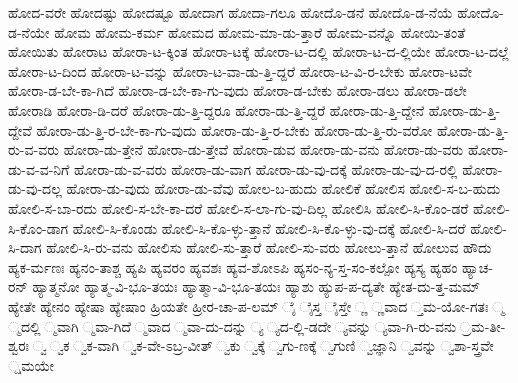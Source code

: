 {ಹೋದ-ವರೇ
ಹೋದಷ್ಟು
ಹೋದಷ್ಟೂ
ಹೋದಾಗ
ಹೋದಾ-ಗಲೂ
ಹೋದೊ-ಡನೆ
ಹೋದೊ-ಡ-ನೆಯೆ
ಹೋದೊ-ಡ-ನೆಯೇ
ಹೋಮ
ಹೋಮ-ಕರ್ಮ
ಹೋಮದ
ಹೋಮ-ಮಾ-ಡು-ತ್ತಾರೆ
ಹೋಮ-ವನ್ನೊ
ಹೋಯಿ-ತಂತೆ
ಹೋಯಿತು
ಹೋರಾಟ
ಹೋರಾ-ಟ-ಕ್ಕಿಂತ
ಹೋರಾ-ಟಕ್ಕೆ
ಹೋರಾ-ಟ-ದಲ್ಲಿ
ಹೋರಾ-ಟ-ದ-ಲ್ಲಿಯೇ
ಹೋರಾ-ಟ-ದಲ್ಲೆ
ಹೋರಾ-ಟ-ದಿಂದ
ಹೋರಾ-ಟ-ವನ್ನು
ಹೋರಾ-ಟ-ವಾ-ಡು-ತ್ತಿ-ದ್ದರೆ
ಹೋರಾ-ಟ-ವಿ-ರ-ಬೇಕು
ಹೋರಾ-ಟವೇ
ಹೋರಾ-ಡ-ಬೇ-ಕಾ-ಗಿದೆ
ಹೋರಾ-ಡ-ಬೇ-ಕಾ-ಗು-ವುದು
ಹೋರಾ-ಡ-ಬೇಕು
ಹೋರಾ-ಡಲು
ಹೋರಾ-ಡಲೇ
ಹೋರಾಡಿ
ಹೋರಾ-ಡಿ-ದರೆ
ಹೋರಾ-ಡು-ತ್ತಿ-ದ್ದರೂ
ಹೋರಾ-ಡು-ತ್ತಿ-ದ್ದರೆ
ಹೋರಾ-ಡು-ತ್ತಿ-ದ್ದೇನೆ
ಹೋರಾ-ಡು-ತ್ತಿ-ದ್ದೇವೆ
ಹೋರಾ-ಡು-ತ್ತಿ-ರ-ಬೇ-ಕಾ-ಗು-ವುದು
ಹೋರಾ-ಡು-ತ್ತಿ-ರ-ಬೇಕು
ಹೋರಾ-ಡು-ತ್ತಿ-ರು-ವರೋ
ಹೋರಾ-ಡು-ತ್ತಿ-ರು-ವ-ವರು
ಹೋರಾ-ಡು-ತ್ತೇನೆ
ಹೋರಾ-ಡು-ತ್ತೇವೆ
ಹೋರಾ-ಡುವ
ಹೋರಾ-ಡು-ವನು
ಹೋರಾ-ಡು-ವರು
ಹೋರಾ-ಡು-ವ-ವ-ನಿಗೆ
ಹೋರಾ-ಡು-ವ-ವರು
ಹೋರಾ-ಡು-ವಾಗ
ಹೋರಾ-ಡು-ವು-ದಕ್ಕೆ
ಹೋರಾ-ಡು-ವು-ದ-ರಲ್ಲಿ
ಹೋರಾ-ಡು-ವು-ದಲ್ಲ
ಹೋರಾ-ಡು-ವುದು
ಹೋರಾ-ಡು-ವೆವು
ಹೋಲ-ಬ-ಹುದು
ಹೋಲಿಕೆ
ಹೋಲಿಸ
ಹೋಲಿ-ಸ-ಬ-ಹುದು
ಹೋಲಿ-ಸ-ಬಾ-ರದು
ಹೋಲಿ-ಸ-ಬೇ-ಕಾ-ದರೆ
ಹೋಲಿ-ಸ-ಲಾ-ಗು-ವು-ದಿಲ್ಲ
ಹೋಲಿಸಿ
ಹೋಲಿ-ಸಿ-ಕೊಂ-ಡರೆ
ಹೋಲಿ-ಸಿ-ಕೊಂ-ಡಾಗ
ಹೋಲಿ-ಸಿ-ಕೊಂಡು
ಹೋಲಿ-ಸಿ-ಕೊ-ಳ್ಳು-ತ್ತಾನೆ
ಹೋಲಿ-ಸಿ-ಕೊ-ಳ್ಳು-ವು-ದಕ್ಕೆ
ಹೋಲಿ-ಸಿ-ದರೆ
ಹೋಲಿ-ಸಿ-ದಾಗ
ಹೋಲಿ-ಸಿ-ರು-ವನು
ಹೋಲಿಸು
ಹೋಲಿ-ಸು-ತ್ತಾರೆ
ಹೋಲಿ-ಸು-ವರು
ಹೋಲು-ತ್ತಾನೆ
ಹೋಲುವ
ಹೌದು
ಹ್ಯಕ-ರ್ಮಣಃ
ಹ್ಯನಂ-ತಾಶ್ಚ
ಹ್ಯಪಿ
ಹ್ಯವರಂ
ಹ್ಯವಶಃ
ಹ್ಯವ-ಶೋಽಪಿ
ಹ್ಯಸಂ-ನ್ಯ-ಸ್ತ-ಸಂ-ಕಲ್ಪೋ
ಹ್ಯಸ್ಯ
ಹ್ಯಹಂ
ಹ್ಯಾಚ-ರನ್
ಹ್ಯಾತ್ಮನೋ
ಹ್ಯಾತ್ಮ-ವಿ-ಭೂ-ತಯಃ
ಹ್ಯಾತ್ಮಾ-ವಿ-ಭೂ-ತಯಃ
ಹ್ಯಾಶು
ಹ್ಯುಪ-ಪ-ದ್ಯತೇ
ಹ್ಯೇತ-ದು-ತ್ತ-ಮಮ್
ಹ್ಯೇತೇ
ಹ್ಯೇನಂ
ಹ್ಯೇಷಾ
ಹ್ಯೇಷಾಂ
ಹ್ರಿಯತೇ
ಹ್ರೀರ-ಚಾ-ಪ-ಲಮ್
ೈ
ೈಸ್ತ
ೈಸ್ತೇ
್ಣ
್ಣವಾದ
್ತಮ-ಯೋ-ಗತಃ
್ಮ
್ಮದಲ್ಲಿ
್ಮವಾಗಿ
್ಮವಾ-ಗಿದೆ
್ಮವಾದ
್ಮವಾ-ದು-ದನ್ನು
್ಯ
್ಯದ-ಲ್ಲಿ-ಡದೇ
್ಯವನ್ನು
್ಯವಾ-ಗಿ-ರು-ವನು
್ರಮ-ತೀ-ಶ್ವರಃ
್ವ
್ವಕ
್ವಕ-ವಾಗಿ
್ವಕ-ವೇ-ಽಬ್ರ-ವೀತ್
್ವಕು
್ವಕ್ಕೆ
್ವಗು-ಣಕ್ಕೆ
್ವಗುಣಿ
್ವಜ್ಞಾನಿ
್ವವನ್ನು
್ವಶಾ-ಸ್ತ್ರವೇ
್ಷಮಯೇ
}
